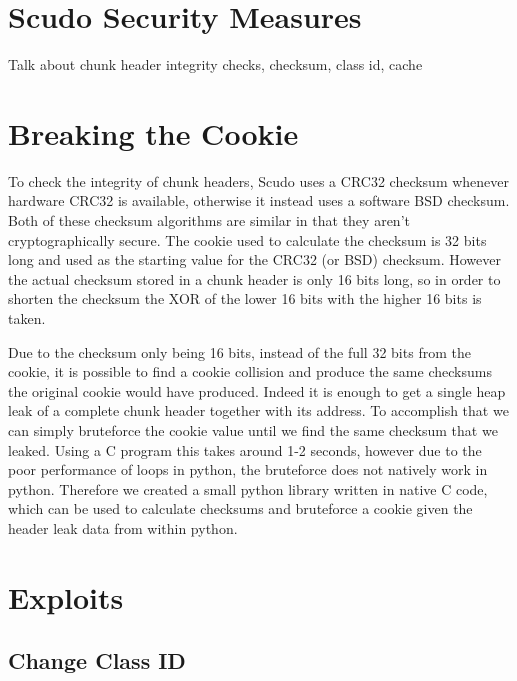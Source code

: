 \documentclass[a4paper,11pt,oneside]{report}
\begin{document}
\chapter{Scudo Security Measures}

Talk about chunk header integrity checks, checksum, class id, cache

\chapter{Breaking the Cookie}

To check the integrity of chunk headers, Scudo uses a CRC32 checksum
whenever hardware CRC32 is available, otherwise it instead uses a software
BSD checksum. Both of these checksum algorithms are similar in that they
aren't cryptographically secure. The cookie used to calculate the checksum
is 32 bits long and used as the starting value for the CRC32 (or BSD) checksum.
However the actual checksum stored in a chunk header is only 16 bits long, so
in order to shorten the checksum the XOR of the lower 16 bits with the higher
16 bits is taken.

Due to the checksum only being 16 bits, instead of the full 32 bits from the
cookie, it is possible to find a cookie collision and produce the same checksums
the original cookie would have produced. Indeed it is enough to get a single
heap leak of a complete chunk header together with its address. To accomplish
that we can simply bruteforce the cookie value until we find the same checksum
that we leaked. Using a C program this takes around 1-2 seconds, however due to
the poor performance of loops in python, the bruteforce does not natively work
in python. Therefore we created a small python library written in native C code,
which can be used to calculate checksums and bruteforce a cookie given the header
leak data from within python.

\chapter{Exploits}

\section{Change Class ID}
\end{document}
